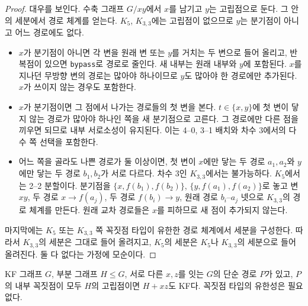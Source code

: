 \begin{proof}
\leanok
대우를 보인다. 수축 그래프 \(G/xy\)에서 \(x\)를 남기고 \(y\)는 고립점으로 둔다. 그 안의 세분에서 경로
체계를 얻는다. \(K_5\), \(K_{3,3}\)에는 고립점이 없으므로 \(y\)는 분기점이 아니고 어느 경로에도 없다.
\begin{itemize}
  \item \(x\)가 분기점이 아니면 각 변을 원래 변 또는 \(y\)를 거치는 두 변으로 들어 올리고, 반복점이 있으면
        \texttt{bypass}로 경로로 줄인다. 새 내부는 원래 내부와 \(y\)에 포함된다. \(x\)를 지나던 무방향 변의
        경로는 많아야 하나이므로 \(y\)도 많아야 한 경로에만 추가된다. \(x\)가 쓰이지 않는 경우도 포함한다.
  \item \(x\)가 분기점이면 그 점에서 나가는 경로들의 첫 변을 본다. \(t \in \{x,y\}\)에 첫 변이 닿지 않는
        경로가 많아야 하나인 쪽을 새 분기점으로 고른다. 그 경로에만 다른 점을 끼우면 되므로 내부 서로소성이
        유지된다. 이는 4--0, 3--1 배치와 차수 3에서의 다수 쪽 선택을 포함한다.
  \item 어느 쪽을 골라도 나쁜 경로가 둘 이상이면, 첫 변이 \(x\)에만 닿는 두 경로 \(a_1,a_2\)와 \(y\)에만
        닿는 두 경로 \(b_1,b_2\)가 서로 다르다. 차수 3인 \(K_{3,3}\)에서는 불가능하다. \(K_5\)에서는 2--2
        분할이다. 분기점을 \(\{x,f(b_1),f(b_2)\}\), \(\{y,f(a_1),f(a_2)\}\)로 놓고 변 \(xy\), 두 경로
        \(x \to f(a_j)\), 두 경로 \(f(b_i) \to y\), 원래 경로 \(b_i\)--\(a_j\) 넷으로 \(K_{3,3}\)의
        경로 체계를 만든다. 원래 교차 경로들은 \(x\)를 피하므로 새 점이 추가되지 않는다.
\end{itemize}
마지막에는 \(K_5\) 또는 \(K_{3,3}\) 쪽 꼭짓점 타입이 유한한 경로 체계에서 세분을 구성한다. 따라서 \(K_{3,3}\)의 세분은 그대로
들어 올려지고, \(K_5\)의 세분은 \(K_5\)나 \(K_{3,3}\)의 세분으로 들어 올려진다. 둘 다 없다는 가정에 모순이다.
\end{proof}

\begin{lemma}
\label{lem:path_replacement}
\leanok
KF 그래프 \(G\), 부분 그래프 \(H \le G\), 서로 다른 \(x,z\)를 잇는 \(G\)의 단순 경로 \(P\)가 있고,
\(P\)의 내부 꼭짓점이 모두 \(H\)의 고립점이면 \(H+ xz\)도 KF다. 꼭짓점 타입의 유한성은 필요 없다.
\end{lemma}

